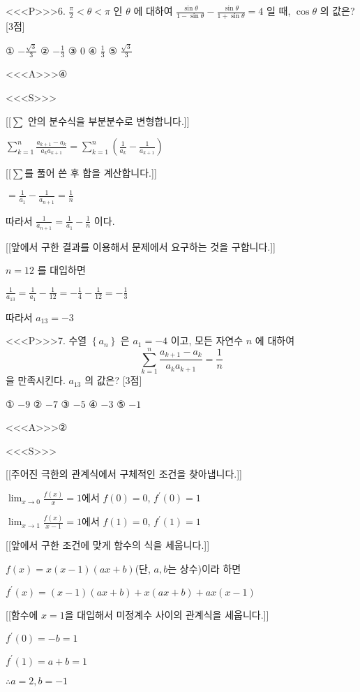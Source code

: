 \documentclass{oblivoir}
\begin{document}
<<<P>>>6. $\frac{\pi}{2}<\theta<\pi$ 인 $\theta$ 에 대하여 $\frac{\sin \theta}{1-\sin \theta}-\frac{\sin \theta}{1+\sin \theta}=4$ 일 때, $\cos \theta$ 의 값은? [3점]

① $-\frac{\sqrt{3}}{3}$
② $-\frac{1}{3}$
③ $0$
④ $\frac{1}{3}$
⑤ $\frac{\sqrt{3}}{3}$

<<<A>>>④

<<<S>>>

[[$\displaystyle\sum$ 안의 분수식을 부분분수로 변형합니다.]]

$ \sum_{k=1}^{n} \frac{a_{k+1}-a_{k}}{a_{k} a_{k+1}} =\sum_{k=1}^{n}\left(\frac{1}{a_{k}}-\frac{1}{a_{k+1}}\right)$

[[$\displaystyle\sum$를 풀어 쓴 후 합을 계산합니다.]]

$=\frac{1}{a_{1}}-\frac{1}{a_{n+1}}=\frac{1}{n}$

따라서 $\frac{1}{a_{n+1}}=\frac{1}{a_{1}}-\frac{1}{n}$ 이다.

[[앞에서 구한 결과를 이용해서 문제에서 요구하는 것을 구합니다.]]

$n=12$ 를 대입하면

$\frac{1}{a_{13}}=\frac{1}{a_{1}}-\frac{1}{12}=-\frac{1}{4}-\frac{1}{12}=-\frac{1}{3}$

따라서 $a_{13}=-3$


<<<P>>>7. 수열 $\left\{a_{n}\right\}$ 은 $a_{1}=-4$ 이고, 모든 자연수 $n$ 에 대하여
$$
\sum_{k=1}^{n} \frac{a_{k+1}-a_{k}}{a_{k} a_{k+1}}=\frac{1}{n}
$$
을 만족시킨다. $a_{13}$ 의 값은? [3점]

① $-9$
② $-7$
③ $-5$
④ $-3$
⑤ $-1$

<<<A>>>②

<<<S>>>

[[주어진 극한의 관계식에서 구체적인 조건을 찾아냅니다.]]

$\lim _{x \rightarrow 0} \frac{f(x)}{x}=1$에서 $f(0)=0$, $f^{\prime}(0)=1$

$\lim _{x \rightarrow 1} \frac{f(x)}{x-1}=1$에서 $f(1)=0$, $f^{\prime}(1)=1$

[[앞에서 구한 조건에 맞게 함수의 식을 세웁니다.]]

$f(x)=x(x-1)(a x+b)$(단, $a, b$는 상수)이라 하면

$f^{\prime}(x)=(x-1)(a x+b)+x(a x+b)+a x(x-1)$

[[함수에 $x=1$을 대입해서 미정계수 사이의 관계식을 세웁니다.]]

$f^{\prime}(0)=-b=1$

$f^{\prime}(1)=a+b=1$

$\therefore a=2, b=-1$
\end{document}
